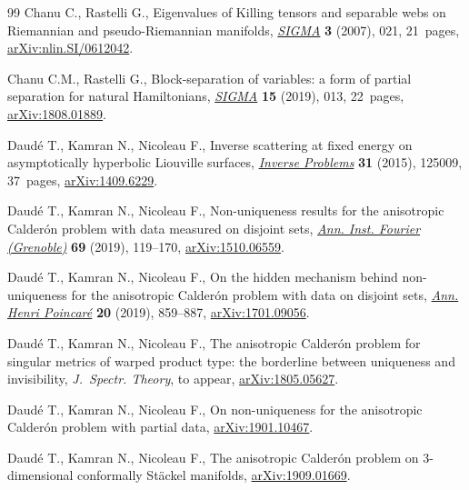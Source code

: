 \documentclass[pdftex]{sigma}
\numberwithin{equation}{section}
\begin{document}
\begin{thebibliography}{99}
Chanu C., Rastelli G., Eigenvalues of {K}illing tensors and separable webs on
 {R}iemannian and pseudo-{R}iemannian manifolds, \href{https://doi.org/10.3842/SIGMA.2007.021}{\textit{SIGMA}} \textbf{3}
 (2007), 021, 21~pages, \href{https://arxiv.org/abs/nlin.SI/0612042}{arXiv:nlin.SI/0612042}.

Chanu C.M., Rastelli G., Block-separation of variables: a form of partial
 separation for natural {H}amiltonians, \href{https://doi.org/10.3842/SIGMA.2019.013}{\textit{SIGMA}} \textbf{15} (2019),
 013, 22~pages, \href{https://arxiv.org/abs/1808.01889}{arXiv:1808.01889}.

Daud\'e T., Kamran N., Nicoleau F., Inverse scattering at fixed energy on
 asymptotically hyperbolic {L}iouville surfaces, \href{https://doi.org/10.1088/0266-5611/31/12/125009}{\textit{Inverse Problems}}
 \textbf{31} (2015), 125009, 37~pages, \href{https://arxiv.org/abs/1409.6229}{arXiv:1409.6229}.

Daud\'e T., Kamran N., Nicoleau F., Non-uniqueness results for the
 anisotropic {C}alder\'{o}n problem with data measured on disjoint sets,
 \href{https://doi.org/10.5802/aif.3240}{\textit{Ann. Inst. Fourier (Grenoble)}} \textbf{69} (2019), 119--170,
 \href{https://arxiv.org/abs/1510.06559}{arXiv:1510.06559}.

Daud\'e T., Kamran N., Nicoleau F., On the hidden mechanism behind
 non-uniqueness for the anisotropic {C}alder\'{o}n problem with data on
 disjoint sets, \href{https://doi.org/10.1007/s00023-018-00755-2}{\textit{Ann. Henri Poincar\'e}} \textbf{20} (2019), 859--887,
 \href{https://arxiv.org/abs/1701.09056}{arXiv:1701.09056}.

Daud\'e T., Kamran N., Nicoleau F., The anisotropic {C}alder\'on problem for
 singular metrics of warped product type: the borderline between uniqueness
 and invisibility, \textit{J.~Spectr. Theory}, {t}o appear,
 \href{https://arxiv.org/abs/1805.05627}{arXiv:1805.05627}.

Daud\'e T., Kamran N., Nicoleau F., On non-uniqueness for the anisotropic
 {C}alder\'on problem with partial data, \href{https://arxiv.org/abs/1901.10467}{arXiv:1901.10467}.

Daud\'e T., Kamran N., Nicoleau F., The anisotropic Calder\'on problem on
 3-dimensional conformally {S}t\"ackel manifolds, \href{https://arxiv.org/abs/1909.01669}{arXiv:1909.01669}.


\end{thebibliography}
\end{document}
